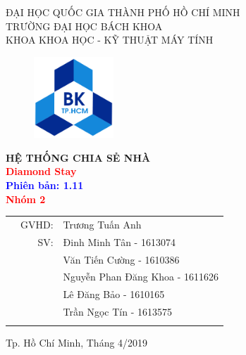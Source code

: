 \documentclass[a4paper]{article}
\begin{document}
\begin{titlepage}
\begin{center}
ĐẠI HỌC QUỐC GIA THÀNH PHỐ HỒ CHÍ MINH \\
TRƯỜNG ĐẠI HỌC BÁCH KHOA \\
KHOA KHOA HỌC - KỸ THUẬT MÁY TÍNH 
\end{center}

\vspace{1cm}

\begin{figure}[h!]
\begin{center}
\includegraphics[width=3cm]{Image/hcmut.png}
\end{center}
\end{figure}

\vspace{0.5cm}

\begin{center}
\textbf{\huge HỆ THỐNG CHIA SẺ NHÀ}\\
\vspace{0.25cm}
\textbf{\Huge \textcolor{red}{Diamond Stay}}\\
\textbf{\huge \textcolor{blue}{Phiên bản: 1.11}}\\
\vspace{1.5cm}
\textcolor{red}{\textbf{\huge  Nhóm 2}}

\end{center}

\vspace{0.7cm}


\begin{table}[h]
\begin{tabular}{rrl}
\hspace{5 cm} & GVHD: & Trương Tuấn Anh\\
& SV: & Đinh Minh Tân - 1613074 \\
& & Văn Tiến Cường - 1610386\\
& & Nguyễn Phan Đăng Khoa - 1611626\\
& & Lê Đăng Bảo - 1610165\\
& & Trần Ngọc Tín - 1613575\\
\vspace{2.3cm}

\end{tabular}
\end{table}

\begin{center}
{\footnotesize Tp. Hồ Chí Minh, Tháng 4/2019}
\end{center}
\end{titlepage}
\end{document}
